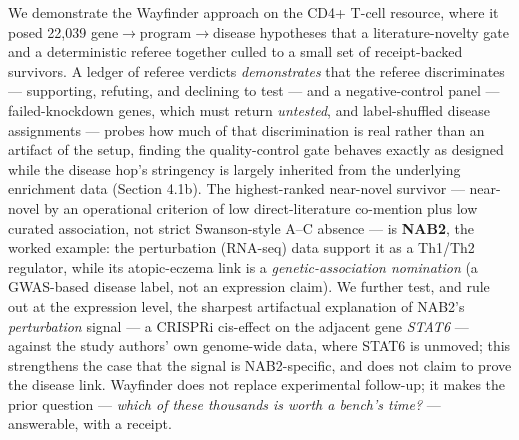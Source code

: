 We demonstrate the Wayfinder approach on the CD4+ T-cell resource, where it posed 22,039
gene$\rightarrow$program$\rightarrow$disease hypotheses that a literature-novelty gate and a deterministic referee together culled
to a small set of receipt-backed survivors. A ledger of referee verdicts \emph{demonstrates} that the
referee discriminates --- supporting, refuting, and declining to test --- and a negative-control panel ---
failed-knockdown genes, which must return \emph{untested}, and label-shuffled disease assignments --- probes how
much of that discrimination is real rather than an artifact of the setup, finding the quality-control gate
behaves exactly as designed while the disease hop's stringency is largely inherited from the underlying
enrichment data (Section 4.1b). The
highest-ranked near-novel survivor --- near-novel by an operational criterion of low direct-literature
co-mention plus low curated association, not strict Swanson-style A--C absence --- is \textbf{NAB2}, the worked
example: the perturbation (RNA-seq) data support it as a Th1/Th2 regulator, while its atopic-eczema link is
a \emph{genetic-association nomination} (a GWAS-based disease label, not an expression claim). We further
test, and rule out at the expression level, the sharpest artifactual explanation of NAB2's \emph{perturbation}
signal --- a CRISPRi cis-effect on the adjacent gene \emph{STAT6} --- against the study authors' own
genome-wide data, where STAT6 is unmoved; this strengthens the case that
the signal is NAB2-specific, and does not claim to prove the disease link. Wayfinder does not replace
experimental follow-up; it makes the prior question --- \emph{which of these thousands is worth a bench's time?}
--- answerable, with a receipt.

